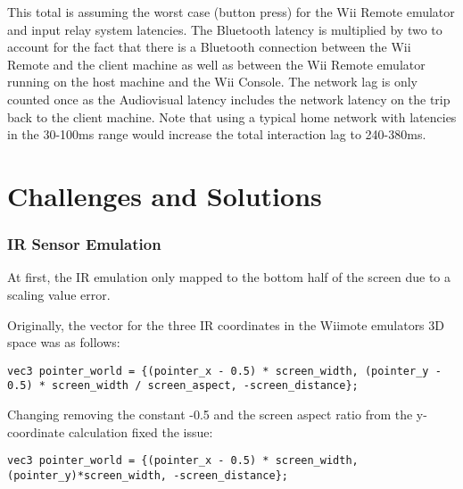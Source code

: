 This total is assuming the worst case (button press) for the Wii Remote emulator
and input relay system latencies. The Bluetooth latency is multiplied by two to
account for the fact that there is a Bluetooth connection between the Wii Remote
and the client machine as well as between the Wii Remote emulator running on the
host machine and the Wii Console. The network lag is only counted once as the
Audiovisual latency includes the network latency on the trip back to the client
machine. Note that using a typical home network with latencies in the 30-100ms
range would increase the total interaction lag to 240-380ms.

\section{Challenges and Solutions}


\subsubsection{IR Sensor Emulation}
At first, the IR emulation only mapped to the bottom half of the screen due to a scaling value error.

Originally, the vector for the three IR coordinates in the Wiimote emulators 3D space was as follows:
\begin{lstlisting}[style=CStyle, emph={vec3}, emphstyle={\color{magenta}}]
vec3 pointer_world = {(pointer_x - 0.5) * screen_width, (pointer_y - 0.5) * screen_width / screen_aspect, -screen_distance};
\end{lstlisting}

Changing removing the constant -0.5 and the screen aspect ratio from the y-coordinate calculation fixed the issue:
\begin{lstlisting}[style=CStyle, emph={vec3}, emphstyle={\color{magenta}}]
vec3 pointer_world = {(pointer_x - 0.5) * screen_width, (pointer_y)*screen_width, -screen_distance};
\end{lstlisting}


